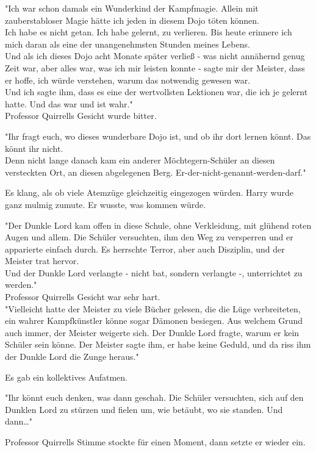 {"Ich war schon damals ein Wunderkind der Kampfmagie. Allein mit zauberstabloser Magie hätte ich jeden in diesem Dojo töten können.\\ Ich habe es nicht getan. Ich habe gelernt, zu verlieren. Bis heute erinnere ich mich daran als eine der unangenehmsten Stunden meines Lebens.\\ Und als ich dieses Dojo acht Monate später verließ - was nicht annähernd genug Zeit war, aber alles war, was ich mir leisten konnte - sagte mir der Meister, dass er hoffe, ich würde verstehen, warum das notwendig gewesen war.\\ Und ich sagte ihm, dass es eine der wertvollsten Lektionen war, die ich je gelernt hatte. Und das war und ist wahr."\\ Professor Quirrells Gesicht wurde bitter.

"Ihr fragt euch, wo dieses wunderbare Dojo ist, und ob ihr dort lernen könnt. Das könnt ihr nicht.\\ Denn nicht lange danach kam ein anderer Möchtegern-Schüler an diesen versteckten Ort, an diesen abgelegenen Berg. Er-der-nicht-genannt-werden-darf."

Es klang, als ob viele Atemzüge gleichzeitig eingezogen würden. Harry wurde ganz mulmig zumute. Er wusste, was kommen würde.

"Der Dunkle Lord kam offen in diese Schule, ohne Verkleidung, mit glühend roten Augen und allem. Die Schüler versuchten, ihm den Weg zu versperren und er apparierte einfach durch. Es herrschte Terror, aber auch Disziplin, und der Meister trat hervor.\\ Und der Dunkle Lord verlangte - nicht bat, sondern verlangte -, unterrichtet zu werden."\\ Professor Quirrells Gesicht war sehr hart.\\ "Vielleicht hatte der Meister zu viele Bücher gelesen, die die Lüge verbreiteten, ein wahrer Kampfkünstler könne sogar Dämonen besiegen. Aus welchem Grund auch immer, der Meister weigerte sich. Der Dunkle Lord fragte, warum er kein Schüler sein könne. Der Meister sagte ihm, er habe keine Geduld, und da riss ihm der Dunkle Lord die Zunge heraus."

Es gab ein kollektives Aufatmen.

"Ihr könnt euch denken, was dann geschah. Die Schüler versuchten, sich auf den Dunklen Lord zu stürzen und fielen um, wie betäubt, wo sie standen. Und dann…"

Professor Quirrells Stimme stockte für einen Moment, dann setzte er wieder ein.

}
